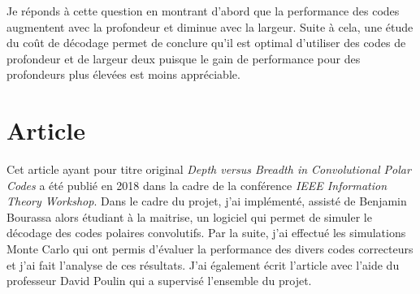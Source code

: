 Je réponds à cette question en montrant d'abord que la performance des codes 
augmentent avec la profondeur et diminue avec la largeur.
Suite à cela, une étude du coût de décodage permet de conclure qu'il est optimal
d'utiliser des codes de profondeur et de largeur deux puisque le gain de performance 
pour des profondeurs plus élevées est moins appréciable.

\section{Article}

Cet article ayant pour titre original \textit{Depth versus Breadth in Convolutional Polar Codes}
a été publié en 2018 dans la cadre de la conférence \textit{IEEE Information Theory Workshop}.
Dans le cadre du projet,
j'ai implémenté, 
assisté de Benjamin Bourassa alors étudiant à la maitrise,
un logiciel qui permet de simuler le décodage des codes polaires convolutifs.
Par la suite,
j'ai effectué les simulations Monte Carlo qui ont permis d'évaluer la performance
des divers codes correcteurs et j'ai fait l'analyse de ces résultats.
J'ai également écrit l'article avec l'aide du professeur David Poulin
qui a supervisé l'ensemble du projet.


